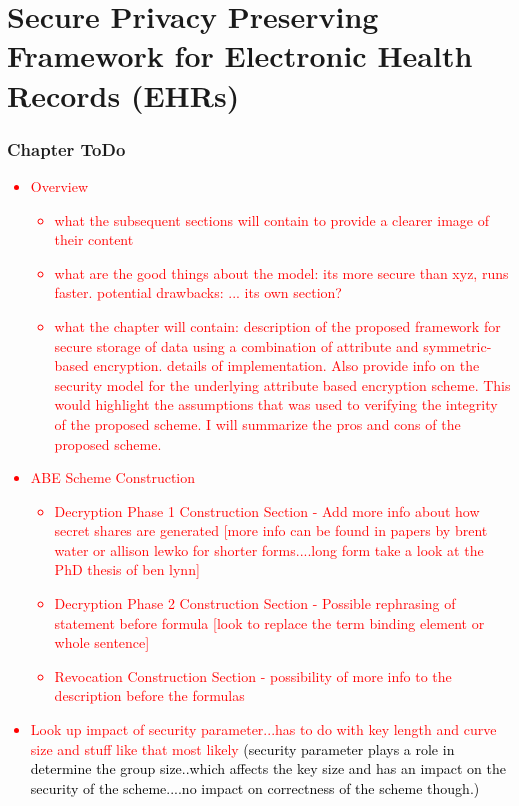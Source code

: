 \chapter{Secure Privacy Preserving Framework for Electronic Health Records (EHRs)}
\label{chap:proposed_solution}


\renewcommand{\theenumi}{\Alph{enumi}}
\renewcommand{\theenumii}{\roman{enumii}}


\subsection*{Chapter ToDo}
\textcolor{red}{
\begin{itemize}
	\item Overview	
	\begin{itemize}
		\item what the subsequent sections will contain to provide a clearer image of their content
		\item what are the good things about the model: its more secure than xyz, runs faster. potential drawbacks: ... its own section?
		\item what the chapter will contain: description of the proposed framework for secure storage of data using a combination of attribute and symmetric-based encryption.  details of implementation. Also provide info on the security model for the underlying attribute based encryption scheme. This would highlight the assumptions that was used to verifying the integrity of the proposed scheme. I will summarize the pros and cons of the proposed scheme.
	\end{itemize}
	\item ABE Scheme Construction
	\begin{itemize}
		\item Decryption Phase 1 Construction Section - Add more info about how secret shares are generated [more info can be found in papers by brent water or allison lewko for shorter forms....long form take a look at the PhD thesis of ben lynn]
		\item Decryption Phase 2 Construction Section - Possible rephrasing of statement before formula [look to replace the term binding element or whole sentence]
		\item Revocation Construction Section - possibility of more info to the description before the formulas
	\end{itemize}
	\item Look up impact of security parameter...has to do with key length and curve size and stuff like that most likely \textcolor{black}{(security parameter plays a role in determine the group size..which affects the key size and has an impact on the security of the scheme....no impact on correctness of the scheme though.)}

\end{itemize}}
